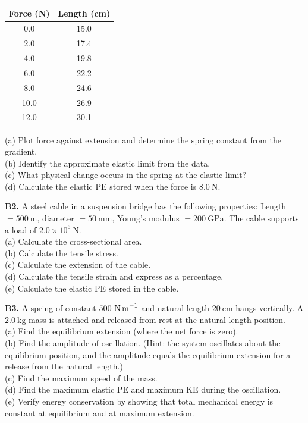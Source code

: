\begin{exercisebox}[9]
\begin{center}
\begin{tabular}{cc}
\toprule
Force (N) & Length (cm)\\
\midrule
0.0 & 15.0\\
2.0 & 17.4\\
4.0 & 19.8\\
6.0 & 22.2\\
8.0 & 24.6\\
10.0 & 26.9\\
12.0 & 30.1\\
\bottomrule
\end{tabular}
\end{center}

(a) Plot force against extension and determine the
spring constant from the gradient.\\
(b) Identify the approximate elastic limit from
the data.\\
(c) What physical change occurs in the spring at
the elastic limit?\\
(d) Calculate the elastic PE stored when the force
is $8.0\ \text{N}$.
\hfill{}

\vspace{0.4cm}

\textbf{B2.} A steel cable in a suspension bridge
has the following properties:
Length $= 500\ \text{m}$, diameter $= 50\ \text{mm}$,
Young's modulus $= 200\ \text{GPa}$.
The cable supports a load of $2.0\times10^6\ \text{N}$.\\[4pt]
(a) Calculate the cross-sectional area.\\
(b) Calculate the tensile stress.\\
(c) Calculate the extension of the cable.\\
(d) Calculate the tensile strain and express as a
percentage.\\
(e) Calculate the elastic PE stored in the cable.
\hfill{}

\vspace{0.4cm}

\textbf{B3.} A spring of constant
$500\ \text{N\,m}^{-1}$ and natural length
$20\ \text{cm}$ hangs vertically. A $2.0\ \text{kg}$
mass is attached and released from rest at the
natural length position.\\[4pt]
(a) Find the equilibrium extension (where the
net force is zero).\\
(b) Find the amplitude of oscillation.
(Hint: the system oscillates about the equilibrium
position, and the amplitude equals the equilibrium
extension for a release from the natural length.)\\
(c) Find the maximum speed of the mass.\\
(d) Find the maximum elastic PE and maximum KE
during the oscillation.\\
(e) Verify energy conservation by showing that total
mechanical energy is constant at equilibrium and
at maximum extension.
\hfill{}


\end{exercisebox}
